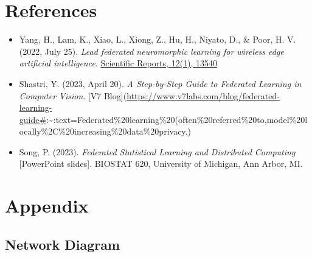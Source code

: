 \documentclass[
]{article}
\begin{document}
\hypertarget{references}{%
\section{References}\label{references}}

\begin{itemize}
\item
  Yang, H., Lam, K., Xiao, L., Xiong, Z., Hu, H., Niyato, D., \& Poor,
  H. V. (2022, July 25). \emph{Lead federated neuromorphic learning for
  wireless edge artificial intelligence}.
  \href{https://scite.ai/reports/10.1038/s41467-022-32020-w}{Scientific
  Reports, 12(1), 13540}
\item
  Shastri, Y. (2023, April 20). \emph{A Step-by-Step Guide to Federated
  Learning in Computer Vision}. {[}V7
  Blog{]}(\url{https://www.v7labs.com/blog/federated-learning-guide\#}:\textasciitilde:text=Federated\%20learning\%20(often\%20referred\%20to,model\%20locally\%2C\%20increasing\%20data\%20privacy.)
\item
  Song, P. (2023). \emph{Federated Statistical Learning and Distributed
  Computing} {[}PowerPoint slides{]}. BIOSTAT 620, University of
  Michigan, Ann Arbor, MI.
\end{itemize}

\hypertarget{appendix}{%
\section{Appendix}\label{appendix}}

\hypertarget{network-diagram}{%
\subsection{Network Diagram}\label{network-diagram}}
\end{document}
